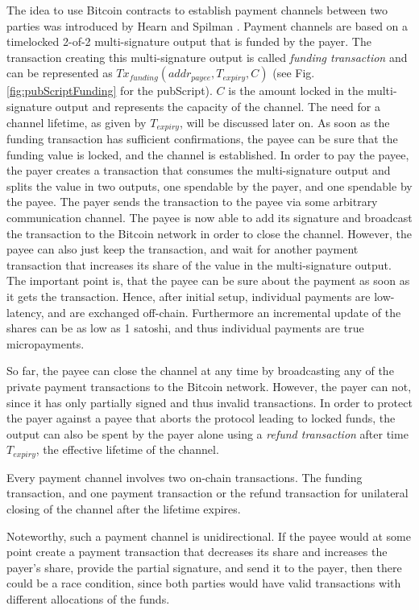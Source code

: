 The idea to use Bitcoin contracts to establish payment channels between two parties was introduced by Hearn and Spilman \parencite{Hearn2013,Spilman2013}. Payment channels are based on a timelocked 2-of-2 multi-signature output that is funded by the payer. The transaction creating this multi-signature output is called \emph{funding transaction} and can be represented as $Tx_{funding}(addr_{payee},T_{expiry},C)$ (see Fig. \ref{fig:pubScriptFunding} for the pubScript). $C$ is the amount locked in the multi-signature output and represents the capacity of the channel. The need for a channel lifetime, as given by $T_{expiry}$, will be discussed later on.
As soon as the funding transaction has sufficient confirmations, the payee can be sure that the funding value is locked, and the channel is established. In order to pay the payee, the payer creates a transaction that consumes the multi-signature output and splits the value in two outputs, one spendable by the payer, and one spendable by the payee. The payer sends the transaction to the payee via some arbitrary communication channel. The payee is now able to add its signature and broadcast the transaction to the Bitcoin network in order to close the channel. However, the payee can also just keep the transaction, and wait for another payment transaction that increases its share of the value in the multi-signature output. The important point is, that the payee can be sure about the payment as soon as it gets the transaction. Hence, after initial setup, individual payments are low-latency, and are exchanged off-chain. Furthermore an incremental update of the shares can be as low as 1 satoshi, and thus individual payments are true micropayments. 

So far, the payee can close the channel at any time by broadcasting any of the private payment transactions to the Bitcoin network. However, the payer can not, since it has only partially signed and thus invalid transactions. In order to protect the payer against a payee that aborts the protocol leading to locked funds, the output can also be spent by the payer alone using a \emph{refund transaction} after time $T_{expiry}$, the effective lifetime of the channel.

Every payment channel involves two on-chain transactions. The funding transaction, and one payment transaction or the refund transaction for unilateral closing of the channel after the lifetime expires.

Noteworthy, such a payment channel is unidirectional. If the payee would at some point create a payment transaction that decreases its share and increases the payer's share, provide the partial signature, and send it to the payer, then there could be a race condition, since both parties would have valid transactions with different allocations of the funds. 

